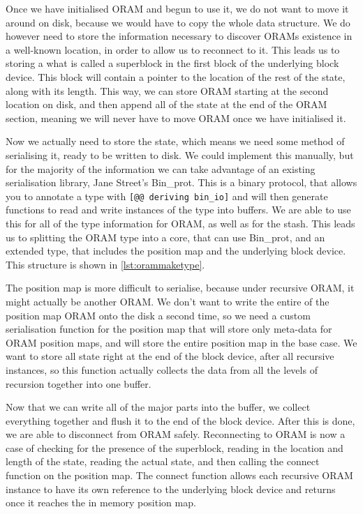 \documentclass[12pt,a4paper,twoside,openright]{report}
\begin{document}
Once we have initialised ORAM and begun to use it, we do not want to move it around on disk, because we would have to copy the whole data structure. We do however need to store the information necessary to discover ORAMs existence in a well-known location, in order to allow us to reconnect to it. This leads us to storing a what is called a superblock in the first block of the underlying block device. This block will contain a pointer to the location of the rest of the state, along with its length. This way, we can store ORAM starting at the second location on disk, and then append all of the state at the end of the ORAM section, meaning we will never have to move ORAM once we have initialised it.

Now we actually need to store the state, which means we need some method of serialising it, ready to be written to disk. We could implement this manually, but for the majority of the information we can take advantage of an existing serialisation library, Jane Street's Bin\_prot. This is a binary protocol, that allows you to annotate a type with \texttt{[@@ deriving bin\_io]} and will then generate functions to read and write instances of the type into buffers. We are able to use this for all of the type information for ORAM, as well as for the stash. This leads us to splitting the ORAM type into a core, that can use Bin\_prot, and an extended type, that includes the position map and the underlying block device. This structure is shown in \cref{lst:orammaketype}.

The position map is more difficult to serialise, because under recursive ORAM, it might actually be another ORAM. We don't want to write the entire of the position map ORAM onto the disk a second time, so we need a custom serialisation function for the position map that will store only meta-data for ORAM position maps, and will store the entire position map in the base case. We want to store all state right at the end of the block device, after all recursive instances, so this function actually collects the data from all the levels of recursion together into one buffer.

Now that we can write all of the major parts into the buffer, we collect everything together and flush it to the end of the block device. After this is done, we are able to disconnect from ORAM safely. Reconnecting to ORAM is now a case of checking for the presence of the superblock, reading in the location and length of the state, reading the actual state, and then calling the connect function on the position map. The connect function allows each recursive ORAM instance to have its own reference to the underlying block device and returns once it reaches the in memory position map.
\end{document}

